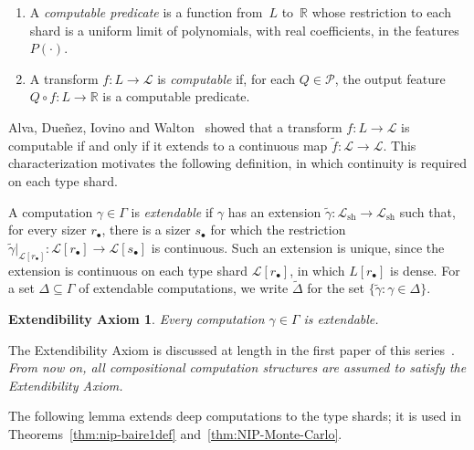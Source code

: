 \documentclass[psamsfonts]{amsart}
\newtheorem*{AxExt}{Extendibility Axiom}
\theoremstyle{definition}
\theoremstyle{remark}
\newcommand{\sh}{\text{sh}}
\newcommand{\rb}{r_{\bullet}}
\numberwithin{equation}{section}
\begin{document}
\begin{enumerate}
\item
  A \emph{computable predicate} is a function from~$L$ to~$\mathbb{R}$ whose restriction to each shard is a uniform limit of polynomials, with real coefficients, in the features~$P(\cdot)$.
\item
  A transform $f\colon L\to \mathcal{L}$ is \emph{computable} if, for each $Q\in\mathcal{P}$, the output feature $Q{\circ}f\colon L\to\mathbb{R}$ is a computable predicate.
\end{enumerate}

Alva, Dueñez, Iovino and Walton~\cite{alva2024approximability} showed that a transform $f\colon L\to\mathcal{L}$ is computable if and only if it extends to a continuous map $\tilde{f}\colon \mathcal{L} \to \mathcal{L}$.
This characterization motivates the following definition, in which continuity is required on each type shard.

A computation $\gamma\in \Gamma$ is \emph{extendable} if $\gamma$ has an extension $\tilde\gamma\colon\mathcal{L}_{\sh}\to\mathcal{L}_{\sh}$ such that,
for every sizer $r_{\bullet}$, there is a sizer $s_\bullet$ for which the restriction $\tilde\gamma|_{\mathcal{L}[r_\bullet]}\colon\mathcal{L}[r_\bullet]\to\mathcal{L}[s_\bullet]$ is continuous.
Such an extension is unique, since the extension is continuous on each type shard $\mathcal{L}[\rb]$, in which $L[\rb]$ is dense.
For a set $\Delta\subseteq\Gamma$ of extendable computations, we write $\tilde{\Delta}$ for the set $\{\tilde\gamma\colon\gamma\in\Delta\}$.

\begin{AxExt}
  \label{ax:extendibility-axiom}
  Every computation $\gamma\in\Gamma$ is extendable.
\end{AxExt}

The Extendibility Axiom is discussed at length in the first paper of this series~\cite{alva2024approximability}.
\emph{From now on, all compositional computation structures are assumed to satisfy the Extendibility Axiom.}

The following lemma extends deep computations to the type shards;
it is used in Theorems~\ref{thm:nip-baire1def} and~\ref{thm:NIP-Monte-Carlo}.
\end{document}
